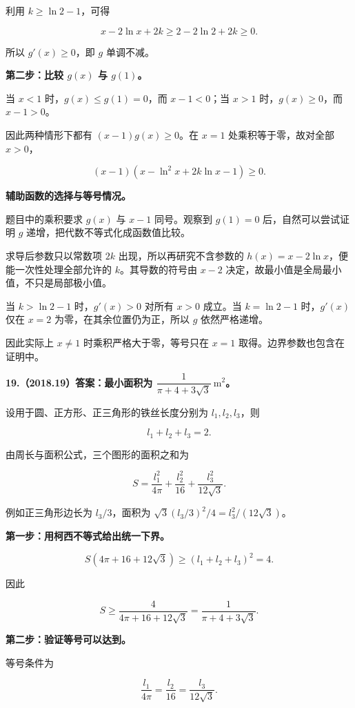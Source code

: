 \documentclass[UTF8,11pt,fontset=windows]{ctexart}
\begin{document}
利用 $k\ge\ln2-1$，可得

$$
x-2\ln x+2k
\ge2-2\ln2+2k\ge0.
$$

所以 $g'(x)\ge0$，即 $g$ 单调不减。

\textbf{第二步：比较 $g(x)$ 与 $g(1)$。}

当 $x<1$ 时，$g(x)\le g(1)=0$，而 $x-1<0$；当 $x>1$ 时，$g(x)\ge0$，而 $x-1>0$。

因此两种情形下都有 $(x-1)g(x)\ge0$。在 $x=1$ 处乘积等于零，故对全部 $x>0$，

$$
(x-1)(x-\ln^2x+2k\ln x-1)\ge0.
$$

\textbf{辅助函数的选择与等号情况。}

题目中的乘积要求 $g(x)$ 与 $x-1$ 同号。观察到 $g(1)=0$ 后，自然可以尝试证明 $g$ 递增，把代数不等式化成函数值比较。

求导后参数只以常数项 $2k$ 出现，所以再研究不含参数的 $h(x)=x-2\ln x$，便能一次性处理全部允许的 $k$。其导数的符号由 $x-2$ 决定，故最小值是全局最小值，不只是局部极小值。

当 $k>\ln2-1$ 时，$g'(x)>0$ 对所有 $x>0$ 成立。当 $k=\ln2-1$ 时，$g'(x)$ 仅在 $x=2$ 为零，在其余位置仍为正，所以 $g$ 依然严格递增。

因此实际上 $x\ne1$ 时乘积严格大于零，等号只在 $x=1$ 取得。边界参数也包含在证明中。

\clearpage

\textbf{19.（2018.19）答案：最小面积为 $\dfrac1{\pi+4+3\sqrt3}\ \mathrm m^2$。}

设用于圆、正方形、正三角形的铁丝长度分别为 $l_1,l_2,l_3$，则

$$
l_1+l_2+l_3=2.
$$

由周长与面积公式，三个图形的面积之和为

$$
S=\frac{l_1^2}{4\pi}+\frac{l_2^2}{16}+\frac{l_3^2}{12\sqrt3}.
$$

例如正三角形边长为 $l_3/3$，面积为 $\sqrt3(l_3/3)^2/4=l_3^2/(12\sqrt3)$。

\textbf{第一步：用柯西不等式给出统一下界。}

$$
S(4\pi+16+12\sqrt3)\ge(l_1+l_2+l_3)^2=4.
$$

因此

$$
S\ge\frac4{4\pi+16+12\sqrt3}
=\frac1{\pi+4+3\sqrt3}.
$$

\textbf{第二步：验证等号可以达到。}

等号条件为

$$
\frac{l_1}{4\pi}=\frac{l_2}{16}=\frac{l_3}{12\sqrt3}.
$$
\end{document}
